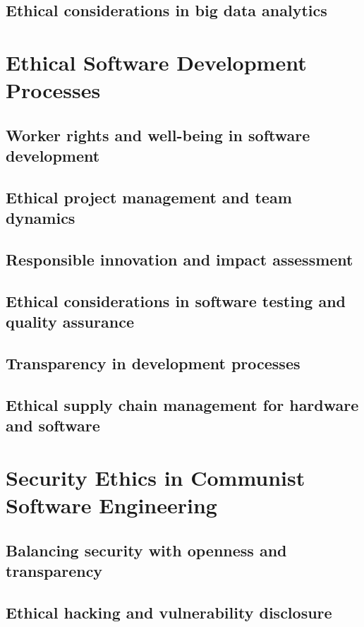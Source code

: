 \subsection{Ethical considerations in big data analytics}

\newpage

\section{Ethical Software Development Processes}
\subsection{Worker rights and well-being in software development}
\subsection{Ethical project management and team dynamics}
\subsection{Responsible innovation and impact assessment}
\subsection{Ethical considerations in software testing and quality assurance}
\subsection{Transparency in development processes}
\subsection{Ethical supply chain management for hardware and software}

\newpage

\section{Security Ethics in Communist Software Engineering}
\subsection{Balancing security with openness and transparency}
\subsection{Ethical hacking and vulnerability disclosure}
